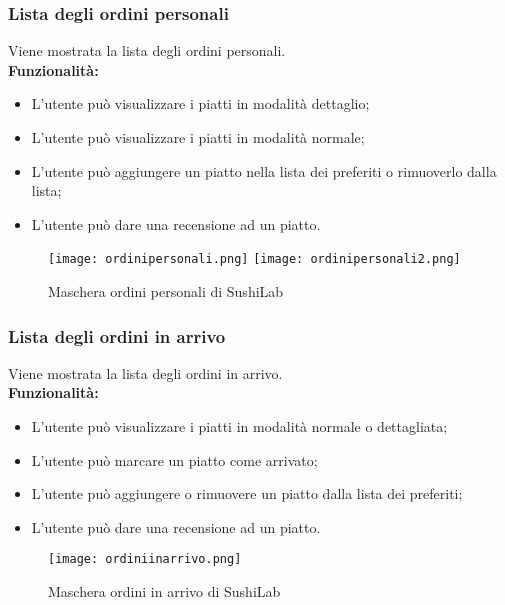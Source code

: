 \subsubsection{Lista degli ordini personali}
Viene mostrata la lista degli ordini personali.\\
\textbf{Funzionalità:}
\begin{itemize}
    \item L'utente può visualizzare i piatti in modalità dettaglio;
    \item L'utente può visualizzare i piatti in modalità normale;
    \item L'utente può aggiungere un piatto nella lista dei preferiti o rimuoverlo dalla lista;
    \item L'utente può dare una recensione ad un piatto.
\end{itemize}
\begin{figure}[H]
    \centering
    \texttt{[image: ordinipersonali.png]}
    \texttt{[image: ordinipersonali2.png]}
    \caption{Maschera ordini personali di SushiLab}
\end{figure}


\subsubsection{Lista degli ordini in arrivo}
Viene mostrata la lista degli ordini in arrivo.\\
\textbf{Funzionalità:}
\begin{itemize}
    \item L'utente può visualizzare i piatti in modalità normale o dettagliata;
    \item L'utente può marcare un piatto come arrivato;
    \item L'utente può aggiungere o rimuovere un piatto dalla lista dei preferiti;
    \item L'utente può dare una recensione ad un piatto.
\end{itemize}
\begin{figure}[H]
    \centering
    \texttt{[image: ordiniinarrivo.png]}
    \caption{Maschera ordini in arrivo di SushiLab}
\end{figure}


